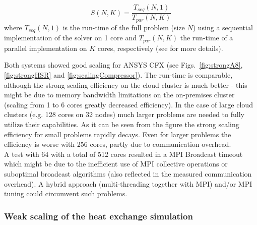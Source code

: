 \documentclass[3p,times]{elsarticle}
\begin{document}
\begin{equation}
\label{eq:speedup}
S(N,K) = \frac{T_{seq}(N,1)}{T_{par}(N,K)}
\end{equation}
where $T_{seq}(N,1)$ is the run-time of the full problem (size $N$) using a sequential implementation of the solver on 1 core and $T_{par}(N,K)$ the run-time of a parallel implementation on $K$ cores, respectively (see \cite{kaminsky15} for more details).

Both systems showed good scaling for ANSYS CFX (see Figs.~\ref{fig:strongA8}, \ref{fig:strongHSR} and \ref{fig:scalingCompressor}). The run-time is comparable, although the strong scaling efficiency on the cloud cluster is much better - this might be due to memory bandwidth limitations on the on-premises cluster (scaling from 1 to 6 cores greatly decreased efficiency).  In the case of large cloud clusters (e.g. 128 cores on 32 nodes) much larger problems are needed to fully utilize their capabilities. As it can be seen from the figure the strong scaling efficiency for small problems rapidly decays. Even for larger problems the efficiency is worse with 256 cores, partly due to communication overhead. \\
A test with 64 with a total of 512 cores resulted in a MPI Broadcast timeout which might be due to the inefficient use of MPI collective operations or suboptimal broadcast algorithms (also reflected in the measured communication overhead). A hybrid approach (multi-threading together with MPI) and/or MPI tuning could circumvent such problems.

 
\subsubsection{Weak scaling of the heat exchange simulation}
\end{document}
